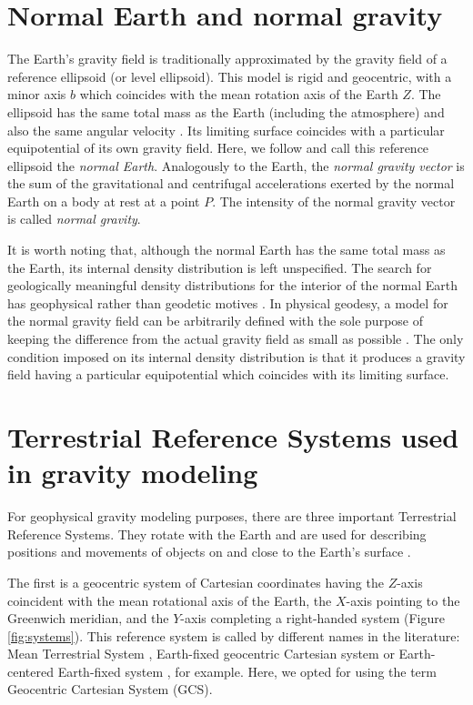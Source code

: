 \documentclass[manuscript]{geophysics}
\begin{document}
\section{Normal Earth and normal gravity}

The Earth's gravity field is traditionally approximated
by the gravity field of a reference ellipsoid (or level ellipsoid).
This model is rigid and geocentric,
with a minor axis $b$ which coincides with
the mean rotation axis of the Earth $Z$.
The ellipsoid has the same total mass as the Earth (including the atmosphere)
and also the same angular velocity \citep{heiskanen-moritz1967,
vanicek1987,hofmann-wellenhof-moritz2005,torge2012}.
Its limiting surface coincides with
a particular equipotential of its own gravity field.
Here, we follow \citep{torge2012} and call this reference ellipsoid
the \textit{normal Earth}.
Analogously to the Earth, the \textit{normal gravity vector} is
the sum of the
gravitational and centrifugal accelerations exerted by the normal
Earth on a body at rest at a point $P$.
The intensity of the normal gravity vector is called \textit{normal gravity}.

It is worth noting that, although the normal Earth has the same total mass as
the Earth, its internal density distribution is left unspecified.
The search for geologically meaningful density distributions
for the interior of the normal Earth has
geophysical rather than geodetic motives \citep{marussi1974}.
In physical geodesy, a model for the normal gravity field
can be arbitrarily defined with the sole purpose of
keeping the difference from the actual gravity field
as small as possible \citep{vanicek1987}.
The only condition imposed on its internal density
distribution is that it produces a gravity field
having a particular equipotential which coincides
with its limiting surface.


\section{Terrestrial Reference Systems used in gravity modeling}

For geophysical gravity modeling purposes, there are three important
Terrestrial Reference Systems.
They rotate with the Earth and are used for describing
positions and movements of objects on and close to the Earth's surface
\citep{torge2012}.

The first is a geocentric system of Cartesian coordinates
having the $Z$-axis coincident with the mean rotational axis of the Earth,
the $X$-axis pointing to the Greenwich meridian,
and the $Y$-axis completing a right-handed system (Figure \ref{fig:systems}).
This reference system is called by different names in the literature:
Mean Terrestrial System \citep[e.g.,][]{soler1976},
Earth-fixed geocentric Cartesian system \citep[e.g.,][]{torge2012}
or Earth-centered Earth-fixed system \citep[e.g.,][]{bouman_etal2013},
for example.
Here, we opted for using the term Geocentric Cartesian System (GCS).
\end{document}
